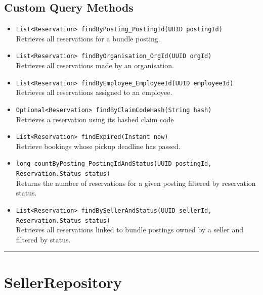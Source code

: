\documentclass[12pt]{article}
\begin{document}
\subsection*{Custom Query Methods}
\begin{itemize}
    \item \texttt{List<Reservation> findByPosting\_PostingId(UUID postingId)} \\
    Retrieves all reservations for a bundle posting.


    \item \texttt{List<Reservation> findByOrganisation\_OrgId(UUID orgId)} \\
    Retrieves all reservations made by an organisation.


    \item \texttt{List<Reservation> findByEmployee\_EmployeeId(UUID employeeId)} \\
    Retrieves all reservations assigned to an employee.


    \item \texttt{Optional<Reservation> findByClaimCodeHash(String hash)} \\
    Retrieves a reservation using its hashed claim code


    \item \texttt{List<Reservation> findExpired(Instant now)} \\
    Retrieve bookings whose pickup deadline has passed.


    \item \texttt{long countByPosting\_PostingIdAndStatus(UUID postingId, \\ Reservation.Status status)} \\
    Returns the number of reservations for a given posting filtered by reservation status.


    \item \texttt{List<Reservation> findBySellerAndStatus(UUID sellerId, \\ Reservation.Status status)} \\
    Retrieves all reservations linked to bundle postings owned by a seller and filtered by status.


\end{itemize}

\hrule
\vspace{1em}

\section{SellerRepository}
\end{document}
